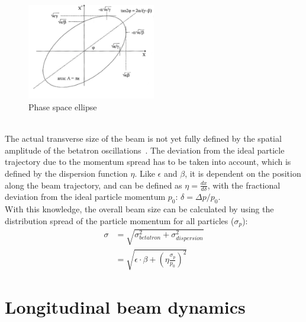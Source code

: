 \begin{figure}[h]
\centering
\includegraphics[width=0.5\textwidth]{Figures/PhaseSpaceEllipse_w_AxisTitles.png}
\caption[Phase space ellipse]{Phase space ellipse~\cite[based on p. 158]{Wiedemann}}
\label{fig:PhaseSpaceEllipse}
\end{figure}
\\
The actual transverse size of the beam is not yet fully defined by the spatial amplitude of the betatron oscillations~\cite[cf. p. 108ff]{Conte}.
The deviation from the ideal particle trajectory due to the momentum spread has to be taken into account, which is defined by the dispersion function $\eta$.
Like $\epsilon$ and $\beta$, it is dependent on the position along the beam trajectory, and can be defined as $\eta = \frac{dx}{d\delta}$, with the fractional deviation from the ideal particle momentum $p_0$: $\delta = \Delta p/p_0$.
\\
With this knowledge, the overall beam size can be calculated by using the distribution spread of the particle momentum for all particles ($\sigma_p$):
\begin{align}
 \sigma&=\sqrt{\sigma^2_{betatron}+\sigma^2_{dispersion}}\\
 &=\sqrt{\epsilon\cdot\beta+\left(\eta\frac{\sigma_p}{p_0}\right)^2}
\end{align}

\section{Longitudinal beam dynamics}
\label{AccPhysics:Bunching}

